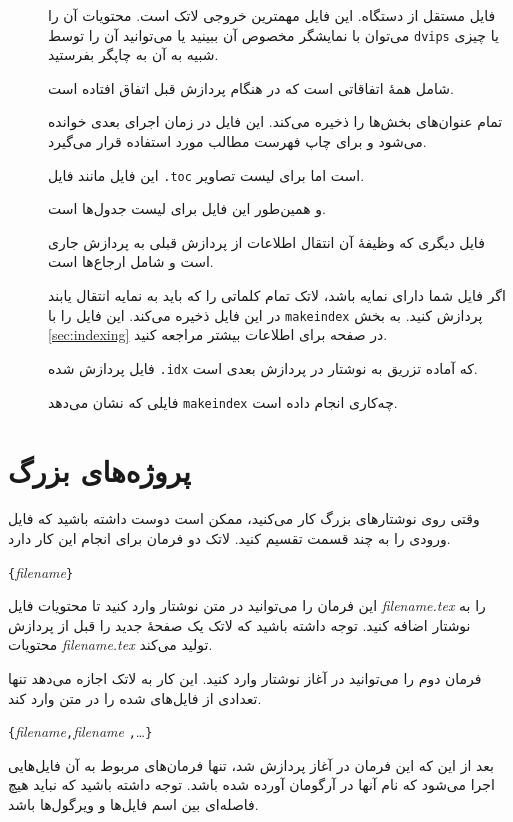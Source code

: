 {\begin{description}
\item[] فایل مستقل از دستگاه. این فایل مهمترین خروجی لاتک است. محتویات آن را می‌توان با نمایشگر مخصوص آن ببینید یا می‌‌توانید آن را توسط \texttt{dvips} یا چیزی شبیه به آن به چاپگر بفرستید.
\item[] شامل همۀ اتفاقاتی است که در هنگام پردازش قبل اتفاق افتاده است.
\item[] تمام عنوان‌های بخش‌ها را ذخیره می‌کند. این فایل در زمان اجرای بعدی خوانده می‌شود و برای چاپ فهرست مطالب مورد استفاده قرار می‌گیرد.
\item[] این فایل مانند فایل \texttt{.toc} است اما برای لیست تصاویر.
\item[] و همین‌طور این فایل برای لیست جدول‌ها است.
\item[] فایل دیگری که وظیفهٔ آن انتقال اطلاعات از پردازش قبلی به پردازش جاری است و شامل ارجاع‌ها است.
\item[] اگر فایل شما دارای نمایه باشد، لاتک تمام کلماتی را که باید به نمایه انتقال یابند در این فایل ذخیره می‌کند. این فایل را با \texttt{makeindex} پردازش کنید. به بخش 
\ref{sec:indexing}
 در صفحه 
\pageref{sec:indexing} برای اطلاعات بیشتر مراجعه کنید.
\item[] فایل پردازش شده \texttt{.idx} که آماده تزریق به نوشتار در پردازش بعدی است.
\item[] فایلی که نشان می‌دهد \texttt{makeindex} چه‌کاری انجام داده است.
\end{description}

\section{پروژه‌های بزرگ}

وقتی روی نوشتار‌های بزرگ کار می‌کنید، ممکن است دوست داشته باشید که فایل ورودی را به چند قسمت تقسیم کنید. لاتک دو فرمان برای انجام این کار دارد.

\begin{lscommand}
\verb|{|\emph{filename}\verb|}|
\end{lscommand}
\noindent این فرمان را می‌توانید در متن نوشتار وارد کنید تا محتویات فایل \emph{filename.tex} را به نوشتار اضافه کنید. توجه داشته باشید 
که لاتک یک صفحهٔ جدید را قبل از پردازش محتویات \emph{filename.tex} تولید می‌کند.

فرمان دوم را می‌توانید در آغاز نوشتار وارد کنید. این کار به لاتک اجازه می‌دهد تنها تعدادی از فایل‌های \verb|| شده را در متن وارد کند.
\begin{lscommand}
\verb|{|\emph{filename}\verb|,|\emph{filename}%
\verb|,|\ldots\verb|}|
\end{lscommand}
بعد از این که این فرمان در آغاز پردازش شد، تنها فرمان‌های  مربوط به آن فایل‌هایی اجرا می‌شود که نام آنها در آرگومان  
آورده شده باشد. توجه داشته باشید که نباید هیچ فاصله‌ای بین اسم فایل‌ها و ویرگول‌ها باشد.

}

